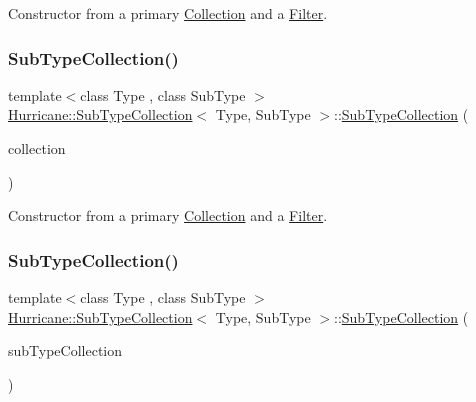 Constructor from a primary \hyperlink{classHurricane_1_1Collection}{Collection} and a \hyperlink{classHurricane_1_1Filter}{Filter}. \mbox{\label{classHurricane_1_1SubTypeCollection_a09df045ff335493ac3068a865b793291}} 
\subsubsection{\texorpdfstring{Sub\+Type\+Collection()}{SubTypeCollection()}\hspace{0.1cm}{\footnotesize\ttfamily [2/3]}}
{\footnotesize\ttfamily template$<$class Type , class Sub\+Type $>$ \\
\hyperlink{classHurricane_1_1SubTypeCollection}{Hurricane\+::\+Sub\+Type\+Collection}$<$ Type, Sub\+Type $>$\+::\hyperlink{classHurricane_1_1SubTypeCollection}{Sub\+Type\+Collection} (\begin{DoxyParamCaption}\item[{const \hyperlink{classHurricane_1_1GenericCollection}{Generic\+Collection}$<$ Type $>$ \&}]{collection }\end{DoxyParamCaption})\hspace{0.3cm}{\ttfamily [inline]}}

Constructor from a primary \hyperlink{classHurricane_1_1Collection}{Collection} and a \hyperlink{classHurricane_1_1Filter}{Filter}. \mbox{\label{classHurricane_1_1SubTypeCollection_a5c223a20f42ebb72d8d4be5ee99bb2d8}} 
\subsubsection{\texorpdfstring{Sub\+Type\+Collection()}{SubTypeCollection()}\hspace{0.1cm}{\footnotesize\ttfamily [3/3]}}
{\footnotesize\ttfamily template$<$class Type , class Sub\+Type $>$ \\
\hyperlink{classHurricane_1_1SubTypeCollection}{Hurricane\+::\+Sub\+Type\+Collection}$<$ Type, Sub\+Type $>$\+::\hyperlink{classHurricane_1_1SubTypeCollection}{Sub\+Type\+Collection} (\begin{DoxyParamCaption}\item[{const \hyperlink{classHurricane_1_1SubTypeCollection}{Sub\+Type\+Collection}$<$ Type, Sub\+Type $>$ \&}]{sub\+Type\+Collection }\end{DoxyParamCaption})\hspace{0.3cm}{\ttfamily [inline]}}


